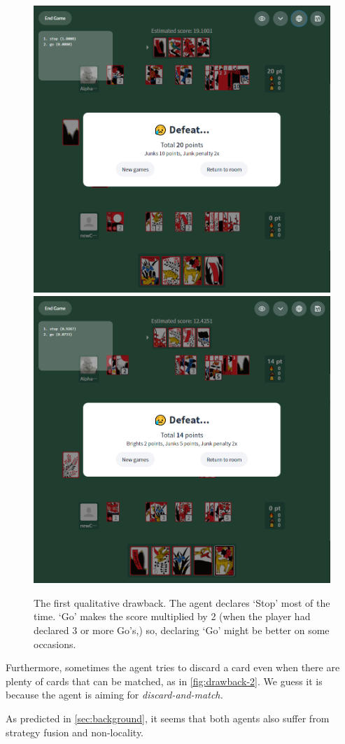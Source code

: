 \documentclass[10pt,twocolumn,letterpaper]{article}
\begin{document}
\begin{figure}[t]
   \centering
   \includegraphics[width=0.48\linewidth]{game-screen-1}
   \hfill
   \includegraphics[width=0.48\linewidth]{game-screen-2}
   \caption{The first qualitative drawback. The agent declares `Stop' most of the time. `Go' makes the score multiplied by 2 (when the player had declared 3 or more Go's,) so, declaring `Go' might be better on some occasions.}
   \label{fig:drawback-1}
\end{figure}

Furthermore, sometimes the agent tries to discard a card even when there are plenty of cards that can be matched, as in \cref{fig:drawback-2}. We guess it is because the agent is aiming for \textit{discard-and-match.}

As predicted in \cref{sec:background}, it seems that both agents also suffer from strategy fusion and non-locality.
\end{document}
